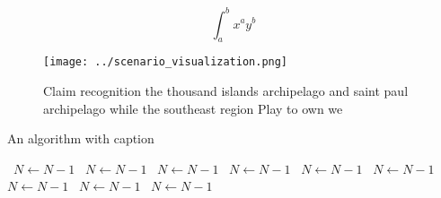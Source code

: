 \documentclass[a4paper]{article}
\begin{document}
\[ \int_{a}^{b}{x^{a}y^{b}} \]

\begin{figure}
\centering
\texttt{[image: ../scenario\_visualization.png]}
\caption{Claim recognition the thousand islands archipelago and saint paul archipelago while the southeast region Play to own we
}
\end{figure}
 
\begin{algorithm}
\caption{An algorithm with caption}
\begin{algorithmic}
\    \State $N \gets N - 1$
\    \State $N \gets N - 1$
\    \State $N \gets N - 1$
\    \State $N \gets N - 1$
\    \State $N \gets N - 1$
\    \State $N \gets N - 1$
\    \State $N \gets N - 1$
\    \State $N \gets N - 1$
\    \State $N \gets N - 1$
\EndWhile
\end{algorithmic}
\end{algorithm}
\end{document}
